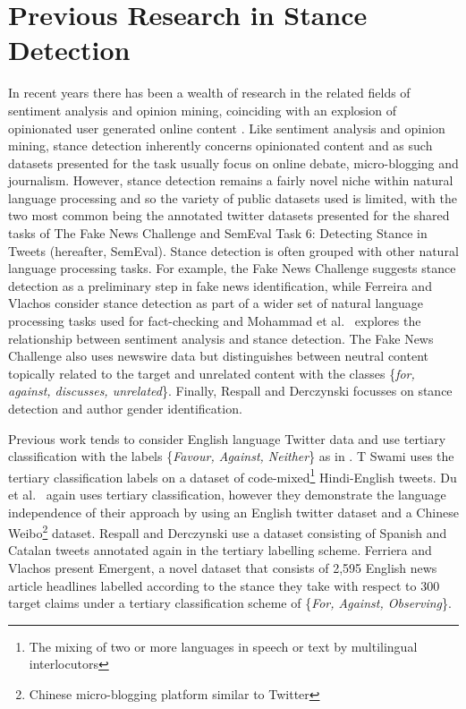 \documentclass[Dissertation.tex]{subfiles}
\begin{document}
\section{Previous Research in Stance Detection} \label{sec:priorWork}
In recent years there has been a wealth of research in the related fields of sentiment analysis and opinion mining, coinciding with an explosion of opinionated user generated online content \cite{liuSentimentAnalysisOpinion}. Like sentiment analysis and opinion mining, stance detection inherently concerns opinionated content and as such datasets presented for the task usually focus on online debate, micro-blogging and journalism. However, stance detection remains a fairly novel niche within natural language processing and so the variety of public datasets used is limited, with the two most common being the annotated twitter datasets presented for the shared tasks of The Fake News Challenge \cite{FakeNewsChallenge} and SemEval Task 6: Detecting Stance in Tweets \cite{TaskDetectingStance} (hereafter, SemEval). Stance detection is often grouped with other natural language processing tasks. For example, the Fake News Challenge suggests stance detection as a preliminary step in fake news identification, while Ferreira and Vlachos consider stance detection as part of a wider set of natural language processing tasks used for fact-checking \cite{ferreiraEmergentNovelDataset2016} and Mohammad et al.\ \cite{mohammadStanceSentimentTweets2016} explores the relationship between sentiment analysis and stance detection. The Fake News Challenge \cite{FakeNewsChallenge} also uses newswire data but distinguishes between neutral content topically related to the target and unrelated content with the classes \{\textit{for, against, discusses, unrelated}\}. Finally, Respall and Derczynski \cite{respallStanceDetectionCatalan} focusses on stance detection and author gender identification.

Previous work tends to consider English language Twitter data and use tertiary classification with the labels \{\textit{Favour, Against, Neither}\} as in \cite{TaskDetectingStance,mohammadStanceSentimentTweets2016,mohammadSemEval2016TaskDetecting2016,augensteinStanceDetectionBidirectional2016,deyTwitterStanceDetection2017,deyTopicalStanceDetection2018}. T Swami \cite{swamiEnglishHindiCodeMixedCorpus2018} uses the tertiary classification labels on a dataset of code-mixed\footnote{The mixing of two or more languages in speech or text by multilingual interlocutors} Hindi-English tweets. Du et al.\  \cite{duStanceClassificationTargetspecific} again uses tertiary classification, however they demonstrate the language independence of their approach by using an English twitter dataset and a Chinese Weibo\footnote{Chinese micro-blogging platform similar to Twitter} dataset.  Respall and Derczynski \cite{respallStanceDetectionCatalan} use a dataset consisting of Spanish and Catalan tweets annotated again in the tertiary labelling scheme. Ferriera and Vlachos \cite{ferreiraEmergentNovelDataset2016} present Emergent, a novel dataset that consists of 2,595 English news article headlines labelled according to the stance they take with respect to 300 target claims under a tertiary classification scheme of \{\textit{For, Against, Observing}\}.
\end{document}
